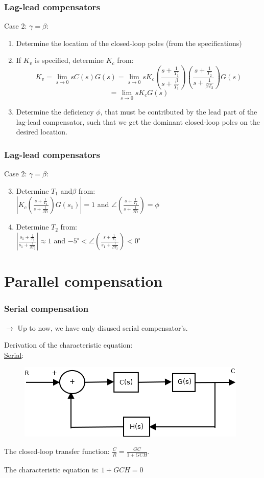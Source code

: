 \begin{frame}
	\frametitle{Lag-lead compensators}
	Case 2: $\gamma= \beta$:
	\begin{enumerate}
		\item Determine the location of the closed-loop poles (from the specifications)
		\item If $K_v$ is specified, determine $K_c$ from:\\
		$$K_v=\lim_{s \to 0} sC(s)G(s)=\lim_{s\to 0}sK_c(\frac{s+\frac{1}{T_1}}{s+\frac{\beta}{T_1}})
		(\frac{s+\frac{1}{T_2}}{s+\frac{1}{\beta T_2}})G(s)$$
		$$=\lim_{s\to0}sK_cG(s)$$\item Determine the deficiency $\phi$, that must be contributed by the lead part of the lag-lead compensator, such that we get the dominant closed-loop poles on the desired location. 
	\end{enumerate}
\end{frame}

\begin{frame}
	\frametitle{Lag-lead compensators}
	Case 2: $\gamma= \beta$:
	\begin{enumerate}
		\setcounter{enumi}{2}
		\item Determine $T_1$ and$\beta$ from:\\
		$|K_c(\frac{s+\frac{1}{T_2}}{s+\frac{1}{\beta T_2}})G(s_1)|=1$ and $\angle(\frac{s+\frac{1}{T_2}}{s+\frac{1}{\beta T_2}})=\phi$
		\item Determine $T_2$ from:\\
		$|\frac{s_1+\frac{1}{T_2}}{s_1+\frac{1}{\beta T_2}}|\approx 1$ and $-5^{\circ}<\angle(\frac{s+\frac{1}{T_2}}{s_1+\frac{1}{\beta T_2}})<0^{\circ}$
	\end{enumerate}
\end{frame}

\section{Parallel compensation}

\begin{frame}
	\frametitle{Serial compensation}
	$\rightarrow$ Up to now, we have only disused serial compensator's. \vspace{4mm}
	
	Derivation of the characteristic equation:\\
	\underline{Serial}:
	\begin{figure}
		\centering
		\includegraphics[width=0.7\linewidth]{Serial_compensator}
	\end{figure}
	The closed-loop transfer function: $\frac{C}{R}=\frac{GC}{1+GCH}$.\vspace{3mm}
	
	The characteristic equation is: $1+GCH=0$
\end{frame}

